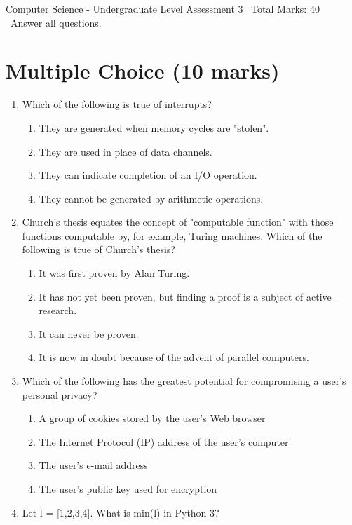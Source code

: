 \documentclass[12pt]{article}
\begin{document}
\begin{center}
Computer Science - Undergraduate Level Assessment 3 \
Total Marks: 40 \
Answer all questions.
\end{center}

\section*{Multiple Choice (10 marks)}
\begin{enumerate}[label=\arabic*.]
\item Which of the following is true of interrupts?
\begin{enumerate}[label=(\alph*)]
    \item They are generated when memory cycles are "stolen".
    \item They are used in place of data channels.
    \item They can indicate completion of an I/O operation.
    \item They cannot be generated by arithmetic operations.
\end{enumerate}
\item Church's thesis equates the concept of "computable function" with those functions computable by, for example, Turing machines. Which of the following is true of Church's thesis?
\begin{enumerate}[label=(\alph*)]
    \item It was first proven by Alan Turing.
    \item It has not yet been proven, but finding a proof is a subject of active research.
    \item It can never be proven.
    \item It is now in doubt because of the advent of parallel computers.
\end{enumerate}
\item Which of the following has the greatest potential for compromising a user's personal privacy?
\begin{enumerate}[label=(\alph*)]
    \item A group of cookies stored by the user's Web browser
    \item The Internet Protocol (IP) address of the user's computer
    \item The user's e-mail address
    \item The user's public key used for encryption
\end{enumerate}
\item Let l = [1,2,3,4]. What is min(l) in Python 3?

\end{enumerate}
\end{document}
